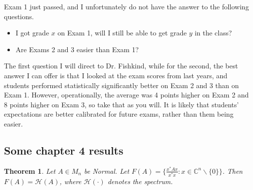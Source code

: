 \documentclass[11pt]{article}
\newcommand{\C}{\ensuremath{\mathbb C}}
\theoremstyle{plain}
\newtheorem{thm}{Theorem}[section]
\theoremstyle{definition}
\theoremstyle{remark}
\begin{document}
Exam 1 just passed, and I unfortunately do not have the answer to the following questions.
\begin{itemize}
    \item I got grade $x$ on Exam 1, will I still be able to get grade $y$ in the class?
    \item Are Exams 2 and 3 easier than Exam 1?
\end{itemize}
The first question I will direct to Dr. Fishkind, while for the second, the best answer I can offer is that I looked at the exam scores from last years, and students performed statistically significantly better on Exam 2 and 3 than on Exam 1. However, operationally, the average was 4 points higher on Exam 2 and 8 points higher on Exam 3, so take that as you will. It is likely that students' expectations are better calibrated for future exams, rather than them being easier.

\subsection*{Some chapter 4 results}

\begin{thm}
    Let $A \in M_n$ be Normal. Let $F(A) = \{\frac{x^* A x}{x^* x} : x \in \C^n \backslash \{0\}\}$. Then $F(A) = \mathcal{H}(A)$, where $\mathcal{H}(\cdot)$ denotes the spectrum.
\end{thm}
\end{document}
